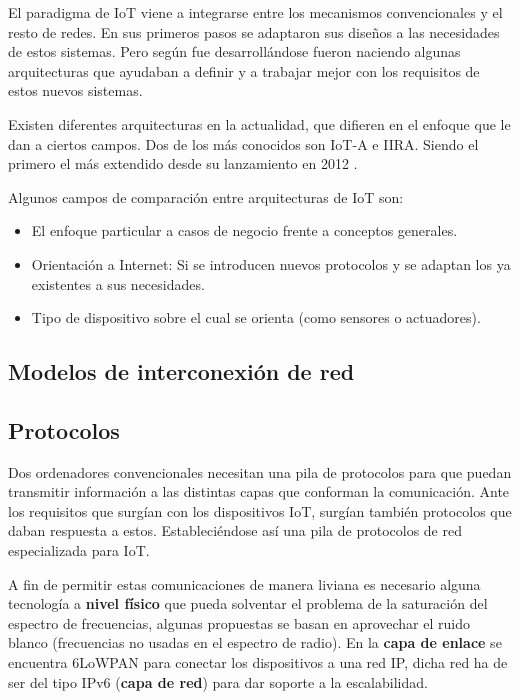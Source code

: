 \documentclass[a4paper,10pt]{article}
\begin{document}
El paradigma de IoT viene a integrarse entre los mecanismos
convencionales y el resto de redes. En sus primeros pasos se adaptaron
sus diseños a las necesidades de estos sistemas. Pero según fue
desarrollándose fueron naciendo algunas arquitecturas que ayudaban a
definir y a trabajar mejor con los requisitos de estos nuevos sistemas.

Existen diferentes arquitecturas en la actualidad, que difieren en el
enfoque que le dan a ciertos campos. Dos de los más conocidos son IoT-A
e IIRA. Siendo el primero el más extendido desde su lanzamiento en 2012
\cite{weyrichReferenceArchitecturesInternet2016}.

Algunos campos de comparación entre arquitecturas de IoT son\cite{atzoriInternetThingsSurvey2010}:

\begin{itemize}
\item
  El enfoque particular a casos de negocio frente a conceptos generales.
\item
  Orientación a Internet: Si se introducen nuevos protocolos y se
  adaptan los ya existentes a sus necesidades.
\item
  Tipo de dispositivo sobre el cual se orienta (como sensores o
  actuadores).
\end{itemize}

\subsection{Modelos de interconexión de
red}\label{modelos-de-interconexiuxf3n-de-red}

\subsection{Protocolos}\label{subsec:protocolos}

Dos ordenadores convencionales necesitan una pila de protocolos para que
puedan transmitir información a las distintas capas que conforman la
comunicación. Ante los requisitos que surgían con los dispositivos IoT,
surgían también protocolos que daban respuesta a estos. Estableciéndose
así una pila de protocolos de red especializada para IoT.

A fin de permitir estas comunicaciones de manera liviana es necesario
alguna tecnología a \textbf{nivel físico} que pueda solventar el
problema de la saturación del espectro de frecuencias, algunas
propuestas se basan en aprovechar el ruido blanco (frecuencias no
usadas en el espectro de radio)\cite{tempertonTVWhiteSpace2015}.  En
la \textbf{capa de enlace} se encuentra 6LoWPAN
\cite{schumacherIPv6LowPowerWireless} para conectar los dispositivos a
una red IP, dicha red ha de ser del tipo IPv6 (\textbf{capa de red})
para dar soporte a la escalabilidad.
\end{document}
